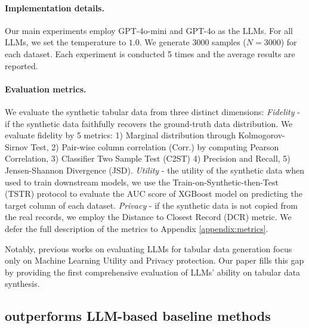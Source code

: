 \paragraph{Implementation details.}
Our main experiments employ GPT-4o-mini and GPT-4o as the LLMs. For all LLMs, we set the temperature to $1.0$. We generate 3000 samples ($N=3000$) for each dataset.
Each experiment is conducted 5 times and the average results are reported. 



\paragraph{Evaluation metrics.}
We evaluate the synthetic tabular data from three distinct dimensions:  \textit{Fidelity} - if the synthetic data faithfully recovers the ground-truth data distribution. We evaluate fidelity by 5 metrics: 1) Marginal distribution through Kolmogorov-Sirnov Test, 2) Pair-wise column correlation (Corr.) by computing Pearson Correlation, 3) Classifier Two Sample Test (C2ST) 4) Precision and Recall,  5) Jensen-Shannon Divergence (JSD).  \textit{Utility} - the utility of the synthetic data when used to train downstream models, we use the Train-on-Synthetic-then-Test (TSTR) protocol to evaluate the AUC score of XGBoost model on predicting the target column of each dataset.  \textit{Privacy} - if the synthetic data is not copied from the real records, we employ the Distance to Closest Record (DCR) metric.
We defer the full description of the metrics to Appendix \ref{appendix:metrics}.


Notably, previous works \citep{great, cllm} on evaluating LLMs for tabular data generation focus only on Machine Learning Utility and Privacy protection. Our paper fills this gap by providing the first comprehensive evaluation of LLMs' ability on tabular data synthesis.



\subsection{\modelname outperforms LLM-based baseline methods} \label{sec:bsl}


